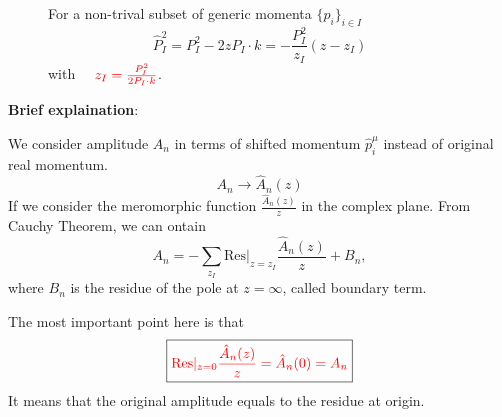 \documentclass{beamer}
\begin{document}
\begin{frame}
\begin{figure}
\begin{minipage}{0.45\textwidth}
\begin{tikzpicture}[scale=0.7,x=0.75pt,y=0.75pt,yscale=-1,xscale=1]
\end{tikzpicture}
    \end{minipage}
    \hspace{1em}
    \begin{minipage}{0.45\textwidth}
        For a non-trival subset of generic momenta $\{p_i\}_{i\in I}$
    \begin{equation*}
        \hat{P}_I^2=P_I^2 -2zP_I\cdot k=-\frac{P_I^2}{z_I}(z-z_I) 
    \end{equation*}
    with $\textcolor{red}{\quad z_I=\frac{P_I^2}{2P_I\cdot k}}$.  
    \end{minipage}
\end{figure} 
\end{frame}

\begin{frame}
    
    \textbf{Brief explaination}: 

    We consider amplitude $A_n$ in terms of shifted momentum $\hat{p}_i^\mu$ instead of original real momentum. 
    \begin{equation*}
        A_n \longrightarrow \hat{A}_n(z)
    \end{equation*}
    \pause
    If we consider the meromorphic function $\frac{\hat{A}_n(z)}{z}$ in the complex plane.
    From Cauchy Theorem, we can ontain
    \begin{equation*}
        A_n=-\sum_{z_I}\textrm{Res}|_{z=z_I}\frac{\hat{A}_n(z)}{z}+B_n,
    \end{equation*}
    where $B_n$ is the residue of the pole at $z=\infty$, called boundary term.

    The most important point here is that
    \begin{equation*}
        \boxed{\color{red}\mathrm{Res}|_{z=0}\frac{\hat{A}_n(z)}{z}=\hat{A}_n(0)=A_n}
    \end{equation*}
    It means that the original amplitude equals to the residue at origin.
\end{frame}
\end{document}
